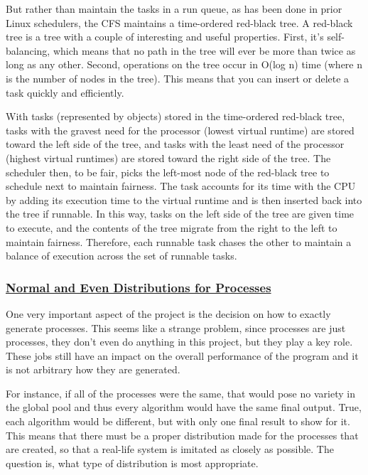 \documentclass{article}
\newcommand{\code}[1]{\codeinline{\texttt{#1}}}
\begin{document}
But rather than maintain the tasks in a run queue, as has been done in prior Linux schedulers, the CFS maintains a time-ordered red-black tree. A red-black tree is a tree with a couple of interesting and useful properties. First, it's self-balancing, which means that no path in the tree will ever be more than twice as long as any other. Second, operations on the tree occur in O(log n) time (where n is the number of nodes in the tree). This means that you can insert or delete a task quickly and efficiently.

With tasks (represented by \code{sched\_entity} objects) stored in the time-ordered red-black tree, tasks with the gravest need for the processor (lowest virtual runtime) are stored toward the left side of the tree, and tasks with the least need of the processor (highest virtual runtimes) are stored toward the right side of the tree. The scheduler then, to be fair, picks the left-most node of the red-black tree to schedule next to maintain fairness. The task accounts for its time with the CPU by adding its execution time to the virtual runtime and is then inserted back into the tree if runnable. In this way, tasks on the left side of the tree are given time to execute, and the contents of the tree migrate from the right to the left to maintain fairness. Therefore, each runnable task chases the other to maintain a balance of execution across the set of runnable tasks.

\subsubsection{\underline{Normal and Even Distributions for Processes}}

One very important aspect of the project is the decision on how to exactly generate processes. This seems like a strange problem, since processes are just processes, they don't even do anything in this project, but they play a key role. These jobs still have an impact on the overall performance of the program and it is not arbitrary how they are generated.

For instance, if all of the processes were the same, that would pose no variety in the global pool and thus every algorithm would have the same final output. True, each algorithm would be different, but with only one final result to show for it. This means that there must be a proper distribution made for the processes that are created, so that a real-life system is imitated as closely as possible. The question is, what type of distribution is most appropriate.
\end{document}
